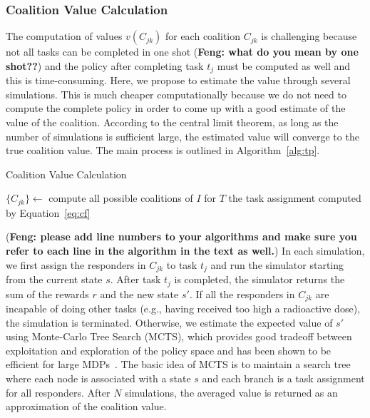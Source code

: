 \subsubsection{Coalition Value Calculation}
The computation of 
values  $v(C_{jk})$ for each coalition $C_{jk}$ is challenging because not all tasks can be
completed in one shot (\textbf{Feng: what do you mean by one shot??}) and the policy after completing task $t_j$
must be computed as well and this is time-consuming. Here, we propose to estimate the value through several simulations. This is much
cheaper computationally because we do not need to compute the complete policy in order to come up with a good estimate of the value of the coalition.
According to the central limit theorem, as long as the number of
simulations is sufficient large, the estimated value will converge
to the true coalition value. The main process is outlined in
Algorithm~\ref{alg:tp}.
\begin{algorithm}[htbp]\small
  \caption{Coalition Value Calculation}
  $\{ C_{jk} \} \gets$ compute all possible coalitions of $I$ for
  $T$ \;
  \Return the task assignment computed by Equation~\ref{eq:cf}
  \label{alg:tp}
\end{algorithm}
(\textbf{Feng: please add line numbers to your algorithms and make sure you refer to each line in the algorithm in the text as well.})
In each simulation, we first assign the responders in $C_{jk}$ to
task $t_j$ and run the simulator starting from the current state
$s$. After task $t_j$ is completed, the simulator returns the sum
of the rewards $r$ and the new state $s'$. If all the responders in
$C_{jk}$ are incapable of doing other tasks (e.g., having received too high
a radioactive dose), the simulation is terminated. Otherwise, we
estimate the expected value of $s'$ using Monte-Carlo Tree Search
(MCTS), which provides good tradeoff between exploitation and
exploration of the policy space and has been shown to be efficient
for large MDPs~\cite{?}. The basic idea of MCTS is to maintain a
search tree where each node is associated with a state $s$ and each
branch is a task assignment for all responders. After $N$
simulations, the averaged value is returned as an approximation of
the coalition value.

